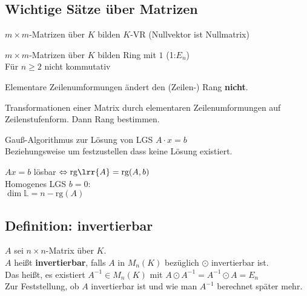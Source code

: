 \subsection{Wichtige Sätze über Matrizen}
		\item $m\times m$-Matrizen über $K$ bilden $K$-VR (Nullvektor ist Nullmatrix)
		\item $m\times m$-Matrizen über $K$ bilden Ring mit $1$ (1:$E_n$)\\
			Für $n\geq 2$ nicht kommutativ
		\item Elementare Zeilenumformungen ändert den (Zeilen-) Rang \textbf{nicht}.
		\item Transformationen einer Matrix durch elementaren Zeilenumformungen auf \\
			Zeilenstufenform. Dann Rang bestimmen.
		\item Gauß-Algorithmus zur Lösung von LGS $A\cdot x=b$\\
			Beziehungsweise um festzustellen dass keine Lösung existiert.
		\item $Ax=b$ lösbar $\Leftrightarrow \mbox{rg}\lrr{A}=\mbox{rg}(A,b)$\\
			Homogenes LGS $b=0$:\\
			$\dim\mathbb{L}=n-\mbox{rg}(A)$
	\subExEnd

\subsection{Definition: invertierbar}
	$A$ sei $n\times n$-Matrix über $K$.\\
	$A$ heißt \textbf{invertierbar}, falls $A$ in $M_n(K)$ bezüglich $\odot$ invertierbar ist.\\
	Das heißt, es existiert $A^{-1}\in M_n(K)$ mit $A\odot A^{-1}=A^{-1}\odot A=E_n$\\
	Zur Feststellung, ob $A$ invertierbar ist und wie man $A^{-1}$ berechnet später mehr.
